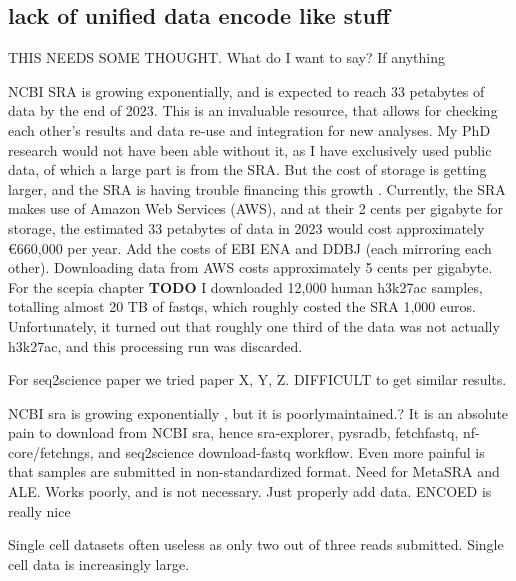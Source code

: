 \subsection{lack of unified data encode like stuff}

THIS NEEDS SOME THOUGHT. What do I want to say? If anything

NCBI SRA is growing exponentially\cite{srawebsite,Katz2021}, and is expected to reach 33 petabytes of data by the end of 2023. This is an invaluable resource, that allows for checking each other's results and data re-use and integration for new analyses. My PhD research would not have been able without it, as I have exclusively used public data, of which a large part is from the SRA. But the cost of storage is getting larger, and the SRA is having trouble financing this growth \cite{srawebsite2}. Currently, the SRA makes use of Amazon Web Services (AWS), and at their 2 cents per gigabyte for storage, the estimated 33 petabytes of data in 2023 would cost approximately €660,000 per year. Add the costs of EBI ENA and DDBJ (each mirroring each other). Downloading data from AWS costs approximately 5 cents per gigabyte. For the scepia chapter \textbf{TODO} I downloaded 12,000 human h3k27ac samples, totalling almost 20 TB of fastqs, which roughly costed the SRA 1,000 euros. Unfortunately, it turned out that roughly one third of the data was not actually h3k27ac, and this processing run was discarded. 


For seq2science paper we tried paper X, Y, Z. DIFFICULT to get similar results.     

% 

NCBI sra is growing exponentially \cite{srawebsite}, but it is poorlymaintained.? It is an absolute pain to download from NCBI sra, hence sra-explorer, pysradb, fetchfastq, nf-core/fetchngs, and seq2science download-fastq workflow. Even more painful is that samples are submitted in non-standardized format. Need for MetaSRA and ALE. Works poorly, and is not necessary. Just properly add data. ENCOED is really nice

Single cell datasets often useless as only two out of three reads submitted. Single cell data is increasingly large.

